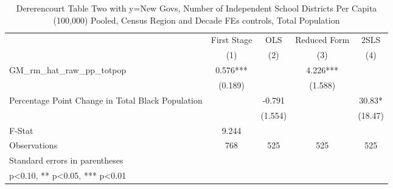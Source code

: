 \begin{table}[htbp]\centering
\def\sym#1{\ifmmode^{#1}\else\(^{#1}\)\fi}
\caption{Dererencourt Table Two with y=New Govs, Number of Independent School Districts Per Capita (100,000) Pooled, Census Region and Decade FEs controls, Total Population}
\begin{tabular}{l*{4}{c}}
\toprule
                    & First Stage   &         OLS   &Reduced Form   &        2SLS   \\
                    &\multicolumn{1}{c}{(1)}   &\multicolumn{1}{c}{(2)}   &\multicolumn{1}{c}{(3)}   &\multicolumn{1}{c}{(4)}   \\
\midrule
GM\_rm\_hat\_raw\_pp\_totpop&       0.576***&               &       4.226***&               \\
                    &     (0.189)   &               &     (1.588)   &               \\
\addlinespace
Percentage Point Change in Total Black Population&               &      -0.791   &               &       30.83*  \\
                    &               &     (1.554)   &               &     (18.47)   \\
\midrule
F-Stat              &       9.244   &               &               &               \\
Observations        &         768   &         525   &         525   &         525   \\
\bottomrule
\multicolumn{5}{l}{\footnotesize Standard errors in parentheses}\\
\multicolumn{5}{l}{\footnotesize * p<0.10, ** p<0.05, *** p<0.01}\\
\end{tabular}
\end{table}
